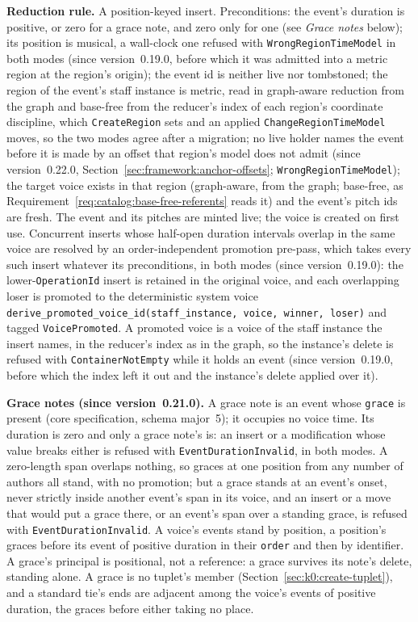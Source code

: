 \documentclass[11pt,letterpaper]{report}
\begin{document}
\textbf{Reduction rule.} A position-keyed insert. Preconditions: the event's
duration is positive, or zero for a grace note, and zero only for one (see
\emph{Grace notes} below); its position is musical, a wall-clock one refused with
\texttt{WrongRegionTimeModel} in both modes (since version~0.19.0, before which
it was admitted into a metric region at the region's origin); the event id is
neither live nor tombstoned; the region of
the event's staff instance is metric, read in graph-aware reduction from the
graph and base-free from the reducer's index of each region's coordinate
discipline, which \texttt{CreateRegion} sets and an applied
\texttt{ChangeRegionTimeModel} moves, so the two modes agree after a migration;
no live holder names the event before it is made by an offset that region's
model does not admit (since version~0.22.0,
Section~\ref{sec:framework:anchor-offsets}; \texttt{WrongRegionTimeModel});
the target voice exists in that region (graph-aware, from the graph; base-free,
as Requirement~\ref{req:catalog:base-free-referents} reads it) and the event's
pitch ids are fresh. The event and its pitches are minted live; the voice is created on
first use. Concurrent inserts whose half-open duration intervals overlap in the
same voice are resolved by an order-independent promotion pre-pass, which
takes every such insert whatever its preconditions, in both modes (since
version~0.19.0): the lower-\texttt{OperationId} insert is retained in the
original voice, and each overlapping loser is promoted to the deterministic
system voice
\texttt{derive\_promoted\_voice\_id(staff\_instance, voice, winner, loser)} and
tagged \texttt{VoicePromoted}. A promoted voice is a voice of the staff
instance the insert names, in the reducer's index as in the graph, so the
instance's delete is refused with \texttt{ContainerNotEmpty} while it holds an
event (since version~0.19.0, before which the index left it out and the
instance's delete applied over it).

\textbf{Grace notes (since version~0.21.0).} A grace note is an event whose
\texttt{grace} is present (core specification, schema major~5); it occupies
no voice time. Its duration is zero and only a grace note's is: an insert or
a modification whose value breaks either is refused with
\texttt{EventDurationInvalid}, in both modes. A zero-length span overlaps
nothing, so graces at one position from any number of authors all stand,
with no promotion; but a grace stands at an event's onset, never strictly
inside another event's span in its voice, and an insert or a move that would
put a grace there, or an event's span over a standing grace, is refused with
\texttt{EventDurationInvalid}. A voice's events stand by position, a
position's graces before its event of positive duration in their
\texttt{order} and then by identifier. A grace's principal is positional, not
a reference: a grace survives its note's delete, standing alone. A grace is
no tuplet's member (Section~\ref{sec:k0:create-tuplet}), and a standard tie's
ends are adjacent among the voice's events of positive duration, the graces
before either taking no place.
\end{document}
